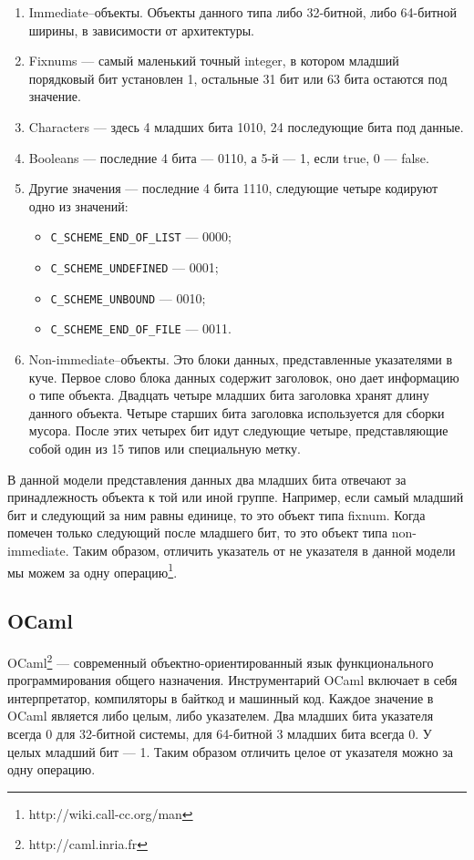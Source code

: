 \begin{enumerate}
\item Immediate--объекты.
Объекты данного типа либо 32-битной, либо 64-битной ширины, в зависимости от архитектуры.
\item Fixnums --- самый маленький точный integer, в котором младший порядковый бит 
установлен 1, остальные 31 бит или 63 бита остаются под значение.
\item Characters --- здесь 4 младших бита 1010, 24 последующие бита под данные.
\item Booleans --- последние 4 бита --- 0110, а 5-й --- 1, если true, 0 --- false.
\item Другие значения --- последние 4 бита 1110, следующие четыре кодируют одно из значений:
\begin{itemize}
\item \lstinline{C_SCHEME_END_OF_LIST} --- 0000;
\item \lstinline{C_SCHEME_UNDEFINED} --- 0001;
\item \lstinline{C_SCHEME_UNBOUND} --- 0010;
\item \lstinline{C_SCHEME_END_OF_FILE} --- 0011.
\end{itemize}

\item Non-immediate--объекты.
Это блоки данных, представленные указателями в куче.
Первое слово блока данных содержит заголовок, оно дает информацию о типе объекта. 
Двадцать четыре младших бита заголовка хранят длину данного объекта.
Четыре старших бита заголовка используется для сборки 
мусора.
После этих четырех бит идут следующие четыре, представляющие собой один из 15 типов или специальную метку.
\end{enumerate}

В данной модели представления данных два младших бита отвечают за принадлежность объекта к той или иной 
группе. Например, если самый младший бит и следующий за ним равны единице, то это объект типа fixnum.
Когда помечен только следующий после младшего бит, то это объект типа non-immediate.
Таким образом, отличить указатель от не указателя в данной модели мы можем за одну 
операцию\footnote{http://wiki.call-cc.org/man}.

\subsection {OСaml}

OCaml\footnote{http://caml.inria.fr} --- современный объектно-ориентированный язык функционального программирования общего назначения. 
Инструментарий OCaml включает в себя интерпретатор, компиляторы в байткод и машинный код.
Каждое значение в OCaml является либо целым, либо указателем.
Два младших бита указателя всегда 0 для 32-битной системы, для 64-битной 3 младших бита всегда 0. У целых младший бит --- 1. 
Таким образом отличить целое от указателя можно за одну операцию.

